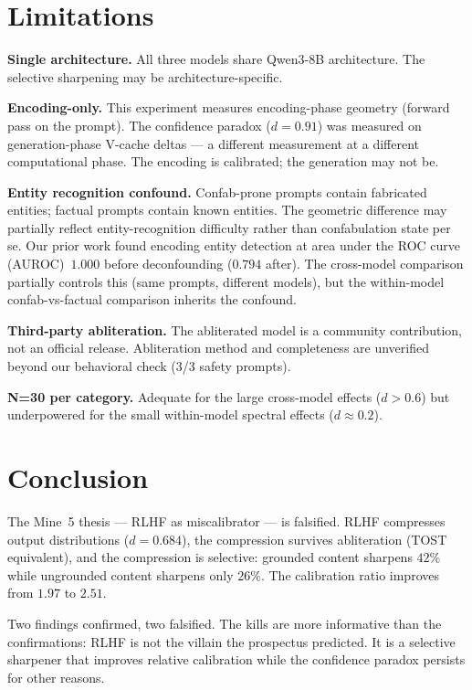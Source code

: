 \documentclass[11pt,a4paper]{article}
\begin{document}
\section{Limitations}
\label{sec:limitations}

\textbf{Single architecture.} All three models share Qwen3-8B
architecture. The selective sharpening may be architecture-specific.

\textbf{Encoding-only.} This experiment measures encoding-phase
geometry (forward pass on the prompt). The confidence paradox
($d{=}0.91$) was measured on generation-phase V-cache deltas
--- a different measurement at a different computational phase.
The encoding is calibrated; the generation may not be.

\textbf{Entity recognition confound.} Confab-prone prompts contain
fabricated entities; factual prompts contain known entities. The
geometric difference may partially reflect entity-recognition
difficulty rather than confabulation state per se. Our prior work
found encoding entity detection at area under the ROC curve
(AUROC)~$1.000$ before
deconfounding ($0.794$ after). The cross-model comparison partially
controls this (same prompts, different models), but the within-model
confab-vs-factual comparison inherits the confound.

\textbf{Third-party abliteration.} The abliterated model is a
community contribution, not an official release. Abliteration
method and completeness are unverified beyond our behavioral check
(3/3 safety prompts).

\textbf{N=30 per category.} Adequate for the large cross-model
effects ($d{>}0.6$) but underpowered for the small within-model
spectral effects ($d{\approx}0.2$).

\section{Conclusion}

The Mine~5 thesis --- RLHF as miscalibrator --- is falsified. RLHF
compresses output distributions ($d{=}0.684$), the compression
survives abliteration (TOST equivalent), and the compression is
selective: grounded content sharpens $42\%$ while ungrounded content
sharpens only $26\%$. The calibration ratio improves from $1.97$
to $2.51$.

Two findings confirmed, two falsified. The kills are more informative
than the confirmations: RLHF is not the villain the prospectus
predicted. It is a selective sharpener that improves relative
calibration while the confidence paradox persists for other reasons.
\end{document}
